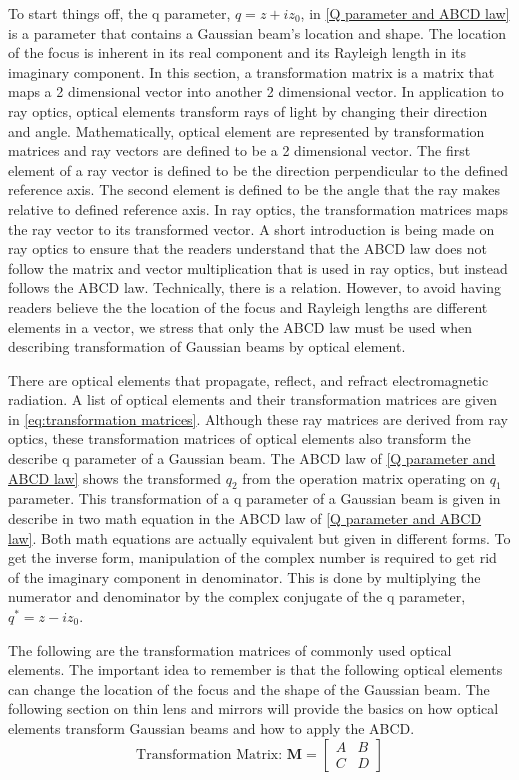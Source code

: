 \documentclass[11pt,a4paper]{book}
\begin{document}
		To start things off, the q parameter, $q = z +iz_0$, in \autoref{Q parameter and ABCD law} is a parameter that contains a Gaussian beam's location and shape. The location of the focus is inherent in its real component and its Rayleigh length in its imaginary component. In this section, a transformation matrix is a matrix that maps a 2 dimensional vector into another 2  dimensional vector. In application to ray optics, optical elements transform rays of light by changing their direction and angle. Mathematically, optical element are represented by transformation matrices and ray vectors are defined to be a 2 dimensional vector. The first element of a ray vector is defined to be the direction perpendicular to the defined reference axis. The second element is defined to be the angle that the ray makes relative to defined reference axis. In ray optics, the transformation matrices maps the ray vector to its transformed vector. A short introduction is being made on ray optics to ensure that the readers understand that the ABCD law does not follow the matrix and vector multiplication that is used in ray optics, but instead follows the ABCD law. Technically, there is a relation. However, to avoid having readers believe the the location of the focus and Rayleigh lengths are different elements in a vector, we stress that only the ABCD law must be used when describing transformation of Gaussian beams by optical element.
		
		There are optical elements that propagate, reflect, and refract electromagnetic radiation. A list of optical elements and their transformation matrices are given in \autoref{eq:transformation matrices}. Although these ray matrices are derived from ray optics, these transformation matrices of optical elements also transform the describe q parameter of a Gaussian beam. The ABCD law of \autoref{Q parameter and ABCD law} shows the transformed $q_2$ from the operation matrix operating on $q_1$ parameter. This transformation of a q parameter of a Gaussian beam is given in describe in two math equation in the ABCD law of \autoref{Q parameter and ABCD law}. Both math equations are actually equivalent but given in different forms. To get the inverse form, manipulation of the complex number is required to get rid of the imaginary component in denominator. This is done by multiplying the numerator and denominator by the complex conjugate of the q parameter, $q^*=z-iz_0$.
		
		\noindent The following are the transformation matrices of commonly used optical elements. The important idea to remember is that the following optical elements can change the location of the focus and the shape of the Gaussian beam. The following section on thin lens and mirrors will provide the basics on how optical elements transform Gaussian beams and how to apply the ABCD.
		\begin{equation}
		\label{eq:M}
		\text{Transformation Matrix: } \textbf{M} = \begin{bmatrix}
		A & B \\
		C & D  
		\end{bmatrix}
		\end{equation}
		
\end{document}
